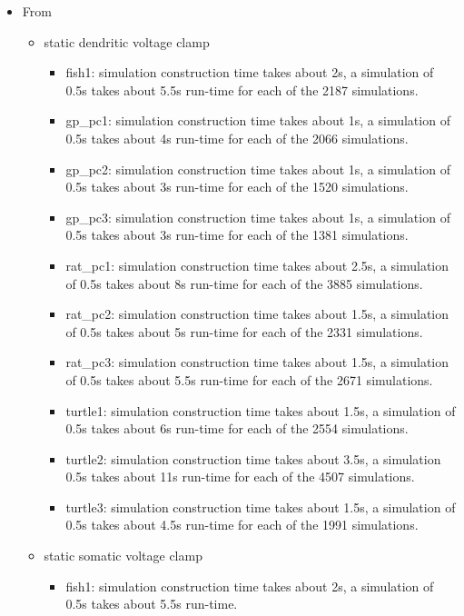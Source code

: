 \documentclass[12pt]{article}
\begin{document}
\begin{itemize}
\item From~\cite{bower09:_compar_evolut_comput_analy_cereb}
  \begin{itemize}
  \item static dendritic voltage clamp
    \begin{itemize}
    \item fish1: simulation construction time takes about 2s, a
      simulation of 0.5s takes about 5.5s run-time for each of the
      2187 simulations.
    \item gp\_pc1: simulation construction time takes about 1s, a
      simulation of 0.5s takes about 4s run-time for each of the 2066
      simulations.
    \item gp\_pc2: simulation construction time takes about 1s, a
      simulation of 0.5s takes about 3s run-time for each of the 1520
      simulations.
    \item gp\_pc3: simulation construction time takes about 1s, a
      simulation of 0.5s takes about 3s run-time for each of the 1381
      simulations.
    \item rat\_pc1: simulation construction time takes about 2.5s, a
      simulation of 0.5s takes about 8s run-time for each of the 3885
      simulations.
    \item rat\_pc2: simulation construction time takes about 1.5s, a
      simulation of 0.5s takes about 5s run-time for each of the 2331
      simulations.
    \item rat\_pc3: simulation construction time takes about 1.5s, a
      simulation of 0.5s takes about 5.5s run-time for each of the
      2671 simulations.
    \item turtle1: simulation construction time takes about 1.5s, a
      simulation of 0.5s takes about 6s run-time for each of the 2554
      simulations.
    \item turtle2: simulation construction time takes about 3.5s, a
      simulation 0.5s takes about 11s run-time for each of the 4507
      simulations.
    \item turtle3: simulation construction time takes about 1.5s, a
      simulation of 0.5s takes about 4.5s run-time for each of the
      1991 simulations.
    \end{itemize}
  \item static somatic voltage clamp
    \begin{itemize}
    \item fish1: simulation construction time takes about 2s, a
      simulation of 0.5s takes about 5.5s run-time.

\end{itemize}
\end{itemize}
\end{itemize}
\end{document}
